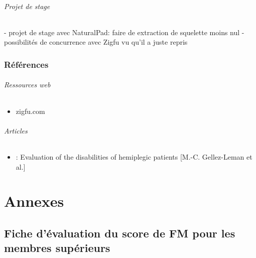 \documentclass[french,12pt]{report}
\begin{document}
\paragraph{Projet de stage} %
		- projet de stage avec NaturalPad: faire de extraction de squelette moins nul		
		- possibilités de concurrence avec Zigfu vu qu'il a juste repris 
		
		\section{Références}
			\paragraph{Ressources web}
				\begin{itemize}
					\item zigfu.com
				\end{itemize}
			\paragraph{Articles}
				\begin {itemize}
					\item : Evaluation of the disabilities of hemiplegic patients [M.-C. Gellez-Leman et al.] \label{ref_analyse_litterature}
				\end{itemize}
				
\part{Annexes}
	\chapter{Fiche d'évaluation du score de FM pour les membres supérieurs} \label{evaluation_FM}
\end{document}
